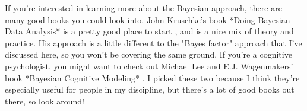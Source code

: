 If you're interested in learning more about the Bayesian approach, there are many good books you could look into. John Kruschke's book *Doing Bayesian Data Analysis* is a pretty good place to start \cite{Kruschke2011}, and is a nice mix of theory and practice. His approach is a little different to the "Bayes factor" approach that I've discussed here, so you won't be covering the same ground. If you're a cognitive psychologist, you might want to check out Michael Lee and E.J. Wagenmakers' book *Bayesian Cognitive Modeling* \cite{Lee2014}. I picked these two because I think they're especially useful for people in my discipline, but there's a lot of good books out there, so look around!




